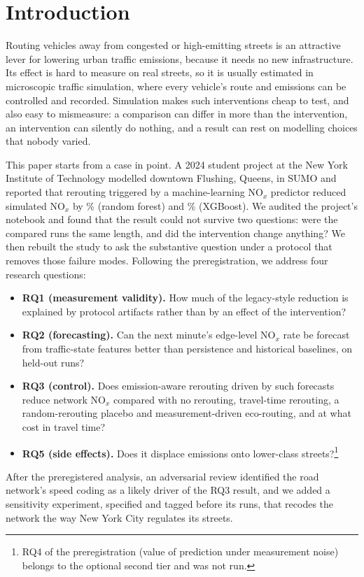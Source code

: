 \documentclass[11pt]{article}
\begin{document}
\section{Introduction}
Routing vehicles away from congested or high-emitting streets is an attractive lever for lowering urban traffic
emissions, because it needs no new infrastructure. Its effect is hard to measure on real streets, so it is usually
estimated in microscopic traffic simulation, where every vehicle's route and emissions can be controlled and
recorded. Simulation makes such interventions cheap to test, and also easy to mismeasure: a comparison can differ in
more than the intervention, an intervention can silently do nothing, and a result can rest on modelling choices
that nobody varied.

This paper starts from a case in point. A 2024 student project at the New York Institute of Technology modelled
downtown Flushing, Queens, in SUMO and reported that rerouting triggered by a machine-learning NO$_x$ predictor
reduced simulated NO$_x$ by \LegacyNOxDropRF\% (random forest) and \LegacyNOxDropXGB\% (XGBoost). We audited the
project's notebook and found that the result could not survive two questions: were the compared runs the same
length, and did the intervention change anything? We then rebuilt the study to ask the substantive question under a
protocol that removes those failure modes. Following the preregistration, we address four research questions:
\begin{itemize}\setlength\itemsep{0pt}
\item \textbf{RQ1 (measurement validity).} How much of the legacy-style reduction is explained by protocol
artifacts rather than by an effect of the intervention?
\item \textbf{RQ2 (forecasting).} Can the next minute's edge-level NO$_x$ rate be forecast from traffic-state
features better than persistence and historical baselines, on held-out runs?
\item \textbf{RQ3 (control).} Does emission-aware rerouting driven by such forecasts reduce network NO$_x$ compared
with no rerouting, travel-time rerouting, a random-rerouting placebo and measurement-driven eco-routing, and at what
cost in travel time?
\item \textbf{RQ5 (side effects).} Does it displace emissions onto lower-class streets?\footnote{RQ4 of the
preregistration (value of prediction under measurement noise) belongs to the optional second tier and was not run.}
\end{itemize}
After the preregistered analysis, an adversarial review identified the road network's speed coding as a likely
driver of the RQ3 result, and we added a sensitivity experiment, specified and tagged before its runs, that recodes
the network the way New York City regulates its streets.
\end{document}
